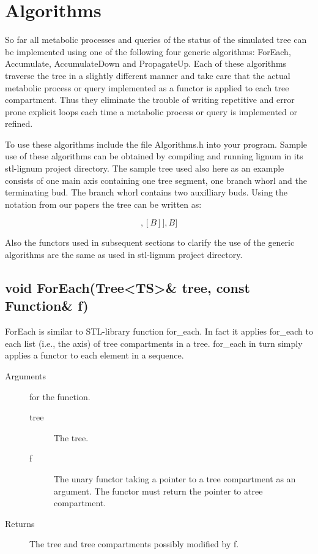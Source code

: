 \section{Algorithms}

So  far all  metabolic  processes and  queries  of the  status of  the
simulated  tree can  be implemented  using one  of the  following four
generic   algorithms:    ForEach,   Accumulate,   AccumulateDown   and
PropagateUp.  Each of these algorithms traverse the tree in a slightly
different manner  and take care  that the actual metabolic  process or
query implemented  as a functor  is applied to each  tree compartment.
Thus they eliminate the trouble  of writing repetitive and error prone
explicit loops each  time a metabolic process or  query is implemented
or refined.

To  use  these algorithms  include  the  file  Algorithms.h into  your
program. Sample use  of these algorithms can be  obtained by compiling
and  running lignum in  its stl-lignum  project directory.  The sample
tree used also here as an example consists of one main axis containing
one tree segment, one branch whorl and the terminating bud. The branch
whorl contains two auxilliary buds. Using the notation from our papers
the tree can be written as:

\begin{displaymath}
[TS,[[B],[B]],B]
\end{displaymath}

Also the  functors used in subsequent  sections to clarify  the use of
the  generic algorithms  are the  same as  used in  stl-lignum project
directory.
 
\subsection{void ForEach(Tree<TS>\& tree, const Function\& f)}

ForEach  is similar  to STL-library  function for\_each.   In  fact it
applies for\_each to  each list (i.e., the axis)  of tree compartments
in a tree.  for\_each in turn simply applies a functor to each element
in a sequence.

\begin{description}
    \item [Arguments] for the function.
      \begin{description}
        \item [tree] The tree.
        \item [f] The unary functor taking a pointer to a tree compartment as an
      argument. The functor must return the pointer to atree compartment.
     \end{description} 
   \item[Returns] The tree and tree compartments possibly modified by f.
\end{description} 

